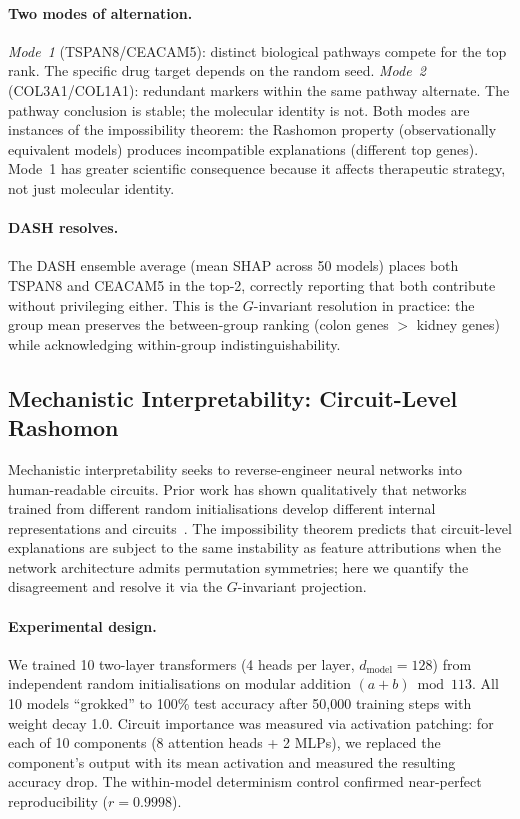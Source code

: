 \documentclass[11pt,a4paper]{article}
\begin{document}
\paragraph{Two modes of alternation.}
\emph{Mode~1} (TSPAN8/CEACAM5): distinct biological pathways compete for the top rank.  The specific drug target depends on the random seed.  \emph{Mode~2} (COL3A1/COL1A1): redundant markers within the same pathway alternate.  The pathway conclusion is stable; the molecular identity is not.  Both modes are instances of the impossibility theorem: the Rashomon property (observationally equivalent models) produces incompatible explanations (different top genes).  Mode~1 has greater scientific consequence because it affects therapeutic strategy, not just molecular identity.

\paragraph{DASH resolves.}
The DASH ensemble average (mean SHAP across 50 models) places both TSPAN8 and CEACAM5 in the top-2, correctly reporting that both contribute without privileging either.  This is the $G$-invariant resolution in practice: the group mean preserves the between-group ranking (colon genes $>$ kidney genes) while acknowledging within-group indistinguishability.

\subsection{Mechanistic Interpretability: Circuit-Level Rashomon}
\label{sec:mi-v2}

Mechanistic interpretability seeks to reverse-engineer neural networks into human-readable circuits.  Prior work has shown qualitatively that networks trained from different random initialisations develop different internal representations and circuits~\citep{chughtai2023toy}.  The impossibility theorem predicts that circuit-level explanations are subject to the same instability as feature attributions when the network architecture admits permutation symmetries; here we quantify the disagreement and resolve it via the $G$-invariant projection.

\paragraph{Experimental design.}
We trained 10 two-layer transformers (4 heads per layer, $d_{\mathrm{model}} = 128$) from independent random initialisations on modular addition $(a + b) \bmod 113$.  All 10 models ``grokked'' to 100\% test accuracy after 50{,}000 training steps with weight decay 1.0.  Circuit importance was measured via activation patching: for each of 10 components (8 attention heads + 2 MLPs), we replaced the component's output with its mean activation and measured the resulting accuracy drop.  The within-model determinism control confirmed near-perfect reproducibility ($r = 0.9998$).
\end{document}
